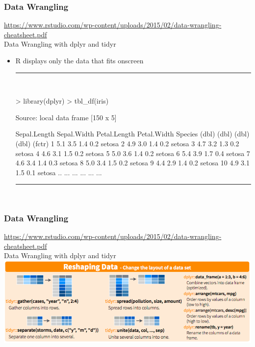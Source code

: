 \documentclass{beamer}
\begin{document}
\begin{frame}[fragile]
	\frametitle{Data Wrangling}
	\centering \tiny \url{https://www.rstudio.com/wp-content/uploads/2015/02/data-wrangling-cheatsheet.pdf}\\
	\centering \Large Data Wrangling with dplyr and tidyr
	\begin{itemize}
	\small

	\item R displays only the data that fits onscreen
		\vspace{5pt}
\rule{\textwidth}{0.4pt}\\
\tiny
\setlength{\fancyvrbtopsep}{-1pt}
\setlength{\fancyvrbpartopsep}{-1pt}
\begin{Schunk}
\begin{Sinput}
> library(dplyr)
> tbl_df(iris)
\end{Sinput}
\begin{Soutput}
Source: local data frame [150 x 5]

   Sepal.Length Sepal.Width Petal.Length Petal.Width Species
          (dbl)       (dbl)        (dbl)       (dbl)  (fctr)
1           5.1         3.5          1.4         0.2  setosa
2           4.9         3.0          1.4         0.2  setosa
3           4.7         3.2          1.3         0.2  setosa
4           4.6         3.1          1.5         0.2  setosa
5           5.0         3.6          1.4         0.2  setosa
6           5.4         3.9          1.7         0.4  setosa
7           4.6         3.4          1.4         0.3  setosa
8           5.0         3.4          1.5         0.2  setosa
9           4.4         2.9          1.4         0.2  setosa
10          4.9         3.1          1.5         0.1  setosa
..          ...         ...          ...         ...     ...
\end{Soutput}
\end{Schunk}
\rule{\textwidth}{0.4pt}\\
\small
	\end{itemize}
\end{frame}

\begin{frame}[fragile]
	\frametitle{Data Wrangling}
	\centering \tiny \url{https://www.rstudio.com/wp-content/uploads/2015/02/data-wrangling-cheatsheet.pdf}\\
	\centering \Large Data Wrangling with dplyr and tidyr
	\vspace{5pt}
	\includegraphics{figures/dp2.png}

\end{frame}
\end{document}
